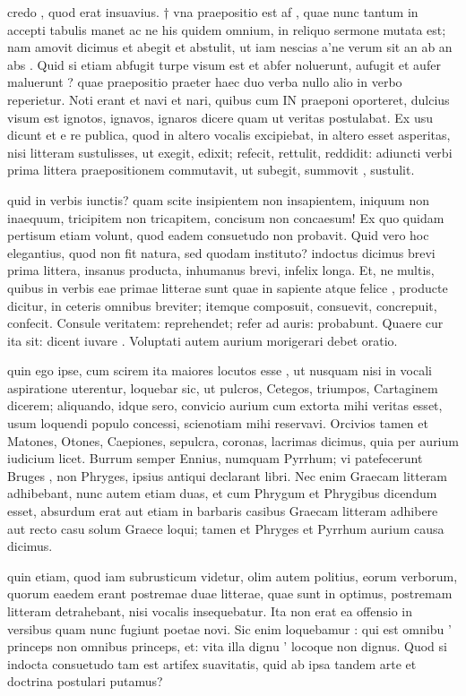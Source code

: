  credo , quod erat insuavius. † vna praepositio est af , quae nunc tantum in accepti tabulis manet ac ne his quidem omnium, in reliquo sermone mutata est; nam amovit dicimus et abegit et abstulit, ut iam nescias a'ne verum sit an ab an abs . Quid si etiam abfugit turpe visum est et abfer noluerunt, aufugit et aufer maluerunt ? quae praepositio praeter haec duo verba nullo alio in verbo reperietur. Noti erant et navi et nari, quibus cum IN praeponi oporteret, dulcius visum est ignotos, ignavos, ignaros dicere quam ut veritas postulabat. Ex usu dicunt et e re publica, quod in altero vocalis excipiebat, in altero esset asperitas, nisi litteram sustulisses, ut exegit, edixit; refecit, rettulit, reddidit: adiuncti verbi prima littera praepositionem commutavit, ut subegit, summovit , sustulit.

 quid in verbis iunctis? quam scite insipientem non insapientem, iniquum non inaequum, tricipitem non tricapitem, concisum non concaesum! Ex quo quidam pertisum etiam volunt, quod eadem consuetudo non probavit. Quid vero hoc elegantius, quod non fit natura, sed quodam instituto? indoctus dicimus brevi prima littera, insanus producta, inhumanus brevi, infelix longa. Et, ne multis, quibus in verbis eae primae litterae sunt quae in sapiente atque felice , producte dicitur, in ceteris omnibus breviter; itemque composuit, consuevit, concrepuit, confecit. Consule veritatem: reprehendet; refer ad auris: probabunt. Quaere cur ita sit: dicent iuvare . Voluptati autem aurium morigerari debet oratio.

 quin ego ipse, cum scirem ita maiores locutos esse , ut nusquam nisi in vocali aspiratione uterentur, loquebar sic, ut pulcros, Cetegos, triumpos, Cartaginem dicerem; aliquando, idque sero, convicio aurium cum extorta mihi veritas esset, usum loquendi populo concessi, scienotiam mihi reservavi. Orcivios tamen et Matones, Otones, Caepiones, sepulcra, coronas, lacrimas dicimus, quia per aurium iudicium licet. Burrum semper Ennius, numquam Pyrrhum; vi patefecerunt Bruges , non Phryges, ipsius antiqui declarant libri. Nec enim Graecam litteram adhibebant, nunc autem etiam duas, et cum Phrygum et Phrygibus dicendum esset, absurdum erat aut etiam in barbaris casibus Graecam litteram adhibere aut recto casu solum Graece loqui; tamen et Phryges et Pyrrhum aurium causa dicimus.

 quin etiam, quod iam subrusticum videtur, olim autem politius, eorum verborum, quorum eaedem erant postremae duae litterae, quae sunt in optimus, postremam litteram detrahebant, nisi vocalis insequebatur. Ita non erat ea offensio in versibus quam nunc fugiunt poetae novi. Sic enim loquebamur : qui est omnibu ' princeps non omnibus princeps, et: vita illa dignu ' locoque non dignus. Quod si indocta consuetudo tam est artifex suavitatis, quid ab ipsa tandem arte et doctrina postulari putamus?

